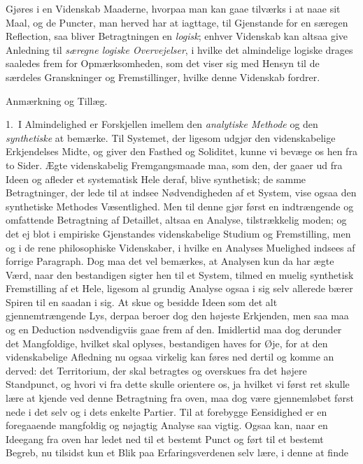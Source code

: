 \documentclass[12pt,a4paper]{book}
\newcommand{\apage}[1]{\marginnote{\footnotesize\textit{[#1]}}}
\begin{document}
Gjøres i en Videnskab Maaderne, hvorpaa man kan gaae tilværks i at naae sit Maal,
og de Puncter, man herved har at iagttage, til Gjenstande for en særegen
Reflection, saa bliver Betragtningen en \emph{logisk}; enhver Videnskab kan altsaa
give Anledning til \emph{særegne logiske Overvejelser}, i hvilke det almindelige
logiske drages saaledes frem for Opmærksomheden, som det viser sig med Hensyn til
de særdeles Granskninger og Fremstillinger, hvilke denne Videnskab fordrer.

\begin{center}Anmærkning og Tillæg.\end{center}

1.~I Almindelighed er Forskjellen imellem den \emph{analytiske Methode} og den
\emph{synthetiske} at bemærke. Til Systemet, der ligesom udgjør den videnskabelige
Erkjendelses Midte, og giver den Fasthed og Soliditet, kunne vi bevæge os hen fra
to Sider. Ægte videnskabelig Fremgangsmaade maa, som den, der gaaer ud fra Ideen
og afleder et systematisk Hele deraf, blive synthetisk; de samme
Betragtninger, der lede til at indsee Nødvendigheden af et System, vise ogsaa den
synthetiske Methodes Væsentlighed. Men \apage{156} til denne gjør først en indtrængende og
omfattende Betragtning af Detaillet, altsaa en Analyse, tilstrækkelig
moden; og det ej blot i empiriske Gjenstandes videnskabelige Studium og
Fremstilling, men og i de rene philosophiske Videnskaber, i hvilke en Analyses
Muelighed indsees af forrige Paragraph. Dog maa det vel bemærkes, at Analysen kun
da har ægte Værd, naar den bestandigen sigter hen til et System, tilmed en muelig
synthetisk Fremstilling af et Hele, ligesom al grundig Analyse ogsaa i sig selv
allerede bærer Spiren til en saadan i sig. At skue og besidde Ideen som det alt
gjennemtrængende Lys, derpaa beroer dog den højeste Erkjenden, men saa maa og en
Deduction nødvendigviis gaae frem af den. Imidlertid maa dog derunder det
Mangfoldige, hvilket skal oplyses, bestandigen haves for Øje, for at den
videnskabelige Afledning nu ogsaa virkelig kan føres ned dertil og komme an
derved: det Territorium, der skal betragtes og overskues fra det højere
Standpunct, og hvori vi fra dette skulle orientere os, ja hvilket vi først ret
skulle lære at kjende ved denne Betragtning fra oven, maa dog være gjennemløbet
først nede i det selv og i dets enkelte Partier. Til at forebygge Eensidighed er
en foregaaende mangfoldig og nøjagtig Analyse saa vigtig. Ogsaa kan, naar en
Ideegang fra oven har ledet ned til et bestemt Punct og ført til et bestemt
Begreb, nu tilsidst \apage{157}  kun et Blik paa Erfaringsverdenen selv lære, i denne at finde
\end{document}
